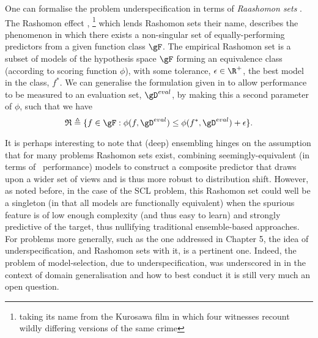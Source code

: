 %
One can formalise the problem underspecification in terms of \emph{Raashomon sets}
\citep{semenova2019study}.
The Rashomon effect \citep{breiman2001statistical},
%
\footnote{taking its name from the Kurosawa film
in which four witnesses recount wildly differing versions of the same crime}
%
which lends Rashomon sets their name, describes the phenomenon in which there exists a
non-singular set of equally-performing predictors from a given function class $\gF$.
%
 The empirical Rashomon set is a subset of models of the hypothesis space $\gF$ forming an
 equivalence class (according to scoring function $\phi$), with some tolerance, $\epsilon \in \R^+$, \wrt{}
 the best model in the class, $f^\ast$. 
%
We can generalise the formulation given in \citet{semenova2019study} to allow performance to be
measured \wrt{} to an evaluation set,  $\gD^{eval}$, by making this a second parameter of
$\phi$, such that we have
%
\begin{equation*}
  \mathfrak{R} \triangleq 
  \{ 
    f \in \gF: \phi(f, \gD^{eval}) 
    \leq 
    \phi( f^\ast, \gD^{eval} ) + \epsilon 
  \}.
\end{equation*}

It is perhaps interesting to note that (deep) ensembling hinges on the assumption that for many
problems Rashomon sets exist, combining seemingly-equivalent (in terms of \iid{}\ performance)
models to construct a composite predictor that draws upon a wider set of views and is thus more
robust to distribution shift.
%
However, as noted before, in the case of the SCL problem, this Rashomon set could well be a
singleton (in that all models are functionally equivalent) when the spurious feature is of low
enough complexity (and thus easy to learn) and strongly predictive of the target, thus nullifying
traditional ensemble-based approaches.
%
For \ood{} problems more generally, such as the one addressed in Chapter 5, the idea of
underspecification, and Rashomon sets with it, is a pertinent one.
%
Indeed, the problem of model-selection, due to underspecification, was underscored in
\cite{gulrajani2020search} in the context of domain generalisation and how to best conduct it is
still very much an open question.

